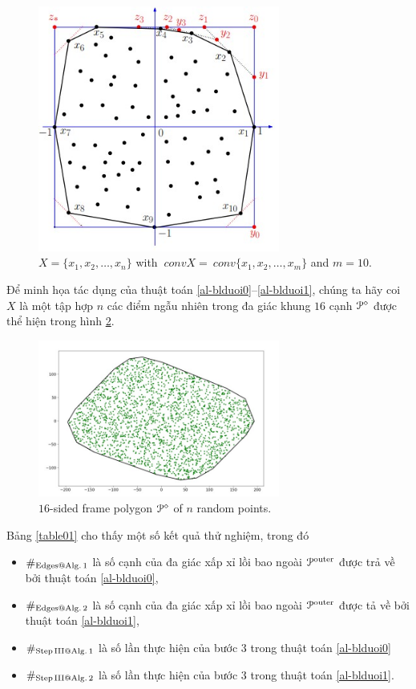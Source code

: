 \documentclass[12pt,a4paper,openany,oneside]{report}
\begin{document}
\begin{figure}[ht!]
	\begin{center}
		\includegraphics[width=300px]{./convex X.jpg}
		\caption{$X = \{x_1, x_2, \dots, x_n\}$ with $\ conv X = \ conv\{x_1, x_2, \dots, x_m\}$ and $m = 10$.}
		\label{fig_dhandang2_1}
	\end{center}
\end{figure}

\medskip
Để minh họa tác dụng của thuật toán \ref{al-blduoi0}--\ref{al-blduoi1}, chúng ta hãy coi $X$ là một tập hợp $n$ các điểm ngẫu nhiên trong đa giác khung $16$ cạnh ${\cal P}^\diamond$ được thể hiện 
trong hình \ref{fig_dhandang2_2}.\\

\begin{figure}[ht!]
	\begin{center}
		\includegraphics[width=300px]{./Frame pylogon.jpg}
		\caption{$16$-sided frame polygon ${\cal P}^\diamond$ of $n$ random points.}
		\label{fig_dhandang2_2}
	\end{center}
\end{figure}
\medskip
Bảng \ref{table01} cho thấy một số kết quả thử nghiệm, trong đó
\begin{itemize}
	\item $\#_{\rm Edges@ Alg.\, 1}$ là số cạnh của đa giác xấp xỉ lồi bao ngoài ${\cal P}^{\rm outer}$ được trả về bởi thuật toán \ref{al-blduoi0},
	\item $\#_{\rm Edges@ Alg.\, 2}$ là số cạnh của đa giác xấp xỉ lồi bao ngoài ${\cal P}^{\rm outer}$ được tả về bởi thuật toán \ref{al-blduoi1},
	\item $\#_{\rm Step\, III @ Alg.\, 1}$  là số lần thực hiện của bước 3 trong thuật toán \ref{al-blduoi0}
	\item $\#_{\rm Step\, III @ Alg.\, 2}$ là số lần thực hiện của bước 3 trong thuật toán \ref{al-blduoi1}.
\end{itemize}
\end{document}
